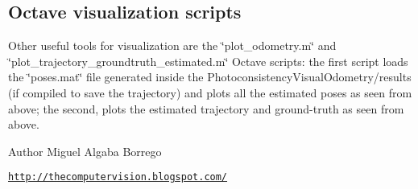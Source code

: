  \hypertarget{index_C}{}\subsection{Octave visualization scripts}\label{index_C}
Other useful tools for visualization are the \char`\"{}plot\_\-odometry.m\char`\"{} and \char`\"{}plot\_\-trajectory\_\-groundtruth\_\-estimated.m\char`\"{} Octave scripts: the first script loads the \char`\"{}poses.mat\char`\"{} file generated inside the PhotoconsistencyVisualOdometry/results (if compiled to save the trajectory) and plots all the estimated poses as seen from above; the second, plots the estimated trajectory and ground-\/truth as seen from above.

  \begin{DoxyAuthor}{Author}
Miguel Algaba Borrego \par
 \href{http://thecomputervision.blogspot.com/}{\tt http://thecomputervision.blogspot.com/} 
\end{DoxyAuthor}
